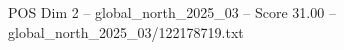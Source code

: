 \begin{textsample}{POS Dim 2 – global\_north\_2025\_03 – Score 31.00 – global\_north\_2025\_03/122178719.txt}
\end{textsample}
